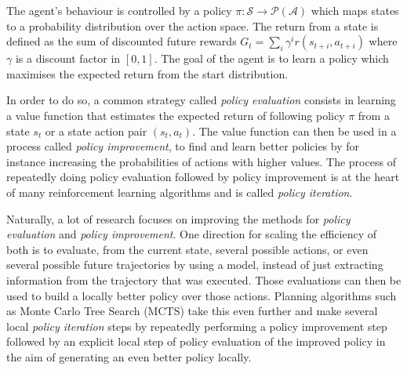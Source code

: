 \documentclass{article}
\begin{document}
The agent's behaviour is controlled by a policy $\pi: \mathcal{S}\to\mathcal{P}(\mathcal{A})$ which maps states to a probability distribution over the action space. The return from a state is defined as the sum of discounted future rewards $G_t = \sum_i \gamma^{i} r(s_{t+i}, a_{t+i})$ where $\gamma$ is a discount factor in $[0,1]$. The goal of the agent is to learn a policy which maximises the expected return from the start distribution.

In order to do so, a common strategy called \emph{policy evaluation} consists in learning a value function that estimates the expected return of following policy $\pi$ from a state $s_t$ or a state action pair $(s_t, a_t)$. The value function can then be used in a process called \emph{policy improvement}, to find and learn better policies by for instance increasing the probabilities of actions with higher values. The process of repeatedly doing policy evaluation followed by policy improvement is at the heart of many reinforcement learning algorithms and is called \emph{policy iteration}.

Naturally, a lot of research focuses on improving the methods for \emph{policy evaluation} and \emph{policy improvement}. One direction for scaling the efficiency of both is to evaluate, from the current state, several possible actions, or even several possible future trajectories by using a model, instead of just extracting information from the trajectory that was executed. Those evaluations can then be used to build a locally better policy over those actions. Planning algorithms such as Monte Carlo Tree Search (MCTS) \cite{coulom:mcts} take this even further and make several local \emph{policy iteration} steps by repeatedly performing a policy improvement step followed by an explicit local step of policy evaluation of the improved policy in the aim of generating an even better policy locally.
\end{document}
